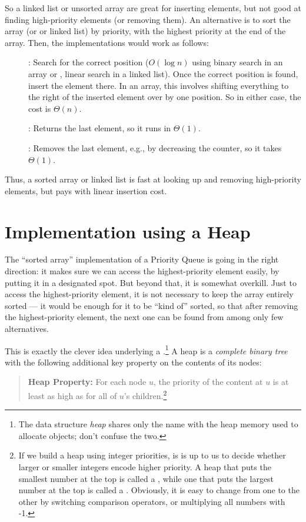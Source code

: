 So a linked list or unsorted array are great for inserting elements,
but not good at finding high-priority elements (or removing them).
An alternative is to sort the array (or  or linked list) by
priority, with the highest priority at the end of the array. Then, the
implementations would work as follows:
\begin{description}
\item[]: Search for the correct position ($O(\log n)$ using
  binary search in an array or , linear search in a linked list). 
  Once the correct position is found, insert the element there. 
  In an array, this involves shifting everything to the right of the inserted
  element over by one position.
  So in either case, the cost is $\Theta(n)$.
\item[]: Returns the last element, so it runs in $\Theta(1)$.
\item[]: Removes the last element, e.g., by decreasing
  the  counter, so it takes $\Theta(1)$.
\end{description}
Thus, a sorted array or linked list is fast at looking up and removing
high-priority elements, but pays with linear insertion cost. 

\section{Implementation using a Heap}
The ``sorted array'' implementation of a Priority Queue is going in
the right direction: it makes sure we can access the highest-priority
element easily, by putting it in a designated spot. 
But beyond that, it is somewhat overkill. Just to access the
highest-priority element, it is not necessary to keep the array
entirely sorted --- it would be enough for it to be ``kind of''
sorted, so that after removing the highest-priority element, the next
one can be found from among only few alternatives.

This is exactly the clever idea underlying a .\footnote{The
  data structure \emph{heap} shares only the name with the heap memory
  used to allocate objects; don't confuse the two.}
A heap is a \emph{complete binary tree} with the following additional
key property on the contents of its nodes:

\begin{quote}
\textbf{Heap Property: }
For each node $u$, the priority of the content at $u$ is at least as
high as for all of $u$'s children.\footnote{If we build a heap using
  integer priorities, is is up to us to decide whether larger or
  smaller integers encode higher priority. A heap that puts the
  smallest number at the top is called a , while one
  that puts the largest number at the top is called a .
  Obviously, it is easy to change from one to the other by switching
  comparison operators, or multiplying all numbers with -1.}
\end{quote}

